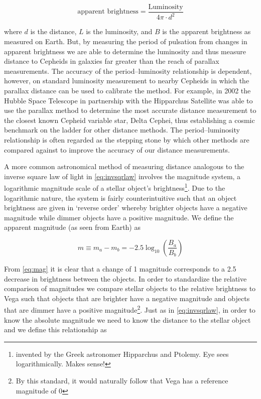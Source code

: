 \begin{equation} \text{apparent brightness} = \frac{\text{Luminosity}}{4 \pi \cdot d^2}\label{eq:invsqrlaw}\end{equation}

where \(d\) is the distance, \(L\) is the luminosity, and \(B\) is the
apparent brightness as measured on Earth. But, by measuring the period
of pulsation from changes in apparent brightness we are able to
determine the luminosity and thus measure distance to Cepheids in
galaxies far greater than the reach of parallax measurements. The
accuracy of the period--luminosity relationship is dependent, however,
on standard luminosity measurement to nearby Cepheids in which the
parallax distance can be used to calibrate the method. For example, in
2002 the Hubble Space Telescope in partnership with the Hipparchus
Satellite was able to use the parallax method to determine the most
accurate distance measurement to the closest known Cepheid variable
star, Delta Cephei, thus establishing a cosmic benchmark on the ladder
for other distance methods. The period--luminosity relationship is often
regarded as the stepping stone by which other methods are compared
against to improve the accuracy of our distance measurements.

A more common astronomical method of measuring distance analogous to the
inverse square law of light in \cref{eq:invsqrlaw}
involves the magnitude system, a logarithmic magnitude scale of a
stellar object's
brightness\footnote{invented by the Greek astronomer Hipparchus and Ptolemy. Eye sees logarithmically. Makes sense!}.
Due to the logarithmic nature, the system is fairly counterintuitive
such that an object brightness are given in `reverse order' whereby
brighter objects have a negative magnitude while dimmer objects have a
positive magnitude. We define the apparent magnitude (as seen from
Earth) as

\begin{equation}m \equiv m_a - m_b = -2.5 \log_{10} \left( \frac{B_a}{B_b} \right)\label{eq:mag}\end{equation}

From \cref{eq:mag} it is clear that a change of 1
magnitude corresponds to a 2.5 decrease in brightness between the
objects. In order to standardize the relative comparison of magnitudes
we compare stellar objects to the relative brightness to Vega such that
objects that are brighter have a negative magnitude and objects that are
dimmer have a positive
magnitude\footnote{By this standard, it would naturally follow that Vega has a reference magnitude of 0}.
Just as in \cref{eq:invsqrlaw}, in order to know the
absolute magnitude we need to know the distance to the stellar object
and we define this relationship as

